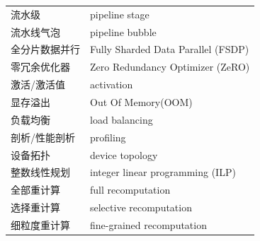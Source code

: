 \begin{longtable}{@{}p{5.6cm}p{7.4cm}@{}}
	流水级 & pipeline stage \\
	流水线气泡 & pipeline bubble \\
	全分片数据并行 & Fully Sharded Data Parallel (FSDP) \\
	零冗余优化器 & Zero Redundancy Optimizer (ZeRO) \\
	激活/激活值 & activation \\
	显存溢出 & Out Of Memory(OOM) \\
	负载均衡 & load balancing \\
	剖析/性能剖析 & profiling \\
	设备拓扑 & device topology \\
	整数线性规划 & integer linear programming (ILP) \\
	全部重计算 & full recomputation \\
	选择重计算 & selective recomputation \\
	细粒度重计算 & fine-grained recomputation \\
\end{longtable}
\endgroup
